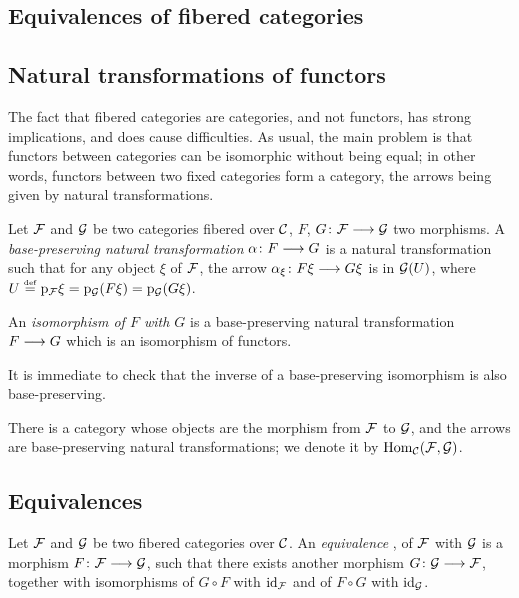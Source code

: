 \begin{3   FIBERED CATEGORIES}
\begin{3.4 Functors and cats fibered in sets}
\end{3.4 Functors and cats fibered in sets}
\begin{3.5 Equivalences of fibered categories}
\setcounter{section}{4}
\section{Equivalences of fibered categories}
\setcounter{theorem}{32}
\subsection{Natural transformations of functors}

The fact that fibered categories are categories, and not functors, has strong implications, and does cause difficulties. As usual, the main problem is that functors between categories can be isomorphic without being equal; in other words, functors between two fixed categories form a category, the arrows being given by natural transformations.

\begin{definition}\label{def:morfunctors} Let $\mathcal{F}$ and $\mathcal{G}$ be two categories fibered over $\mathcal{C}$, $F$, $G \colon \cF \arr \cG$ two morphisms. A \emph{base-preserving natural transformation}%
%
 $\alpha\colon F \arr G$ is a natural transformation such that for any object $\xi$ of $\mathcal{F}$, the arrow $\alpha_\xi \colon F \xi \arr G \xi$ is in $\mathcal{G}(U)$, where $U \overset{\mathrm{\scriptscriptstyle def}} = \mathrm{p}_{\mathcal{F}} \xi = \mathrm{p}_{\mathcal{G}}(F \xi) = \mathrm{p}_{\mathcal{G}}(G \xi)$.

An \emph{isomorphism of $F$ with $G$} is a base-preserving natural transformation $F \arr G$ which is an isomorphism of functors. 
\end{definition}


It is immediate to check that the inverse of a base-preserving isomorphism is also base-preserving.

There is a category whose objects are the morphism from $\mathcal{F}$ to $\mathcal{G}$, and the arrows are base-preserving natural transformations; we denote it by $\operatorname{Hom}_{\mathcal{C}}(\mathcal{F}, \mathcal{G})$.



\subsection{Equivalences}

\begin{definition} Let $\mathcal{F}$ and $\mathcal{G}$ be two fibered categories over $\mathcal{C}$. An \emph{equivalence}%
, of $\mathcal{F}$ with $\mathcal{G}$ is a morphism $F \colon \cF \arr \cG$, such that there exists another morphism $G \colon \cG \arr \cF$, together with isomorphisms of $G \circ F$ with $\mathrm{id}_{\mathcal{F}}$ and of $F \circ G$ with $\mathrm{id}_{\mathcal{G}}$.


\end{definition}
\end{3.5 Equivalences of fibered categories}
\end{3   FIBERED CATEGORIES}
